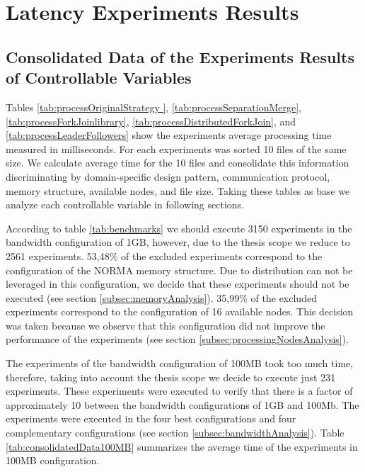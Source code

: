 \section{Latency Experiments Results}

\subsection{Consolidated Data of the Experiments Results of Controllable Variables}
\label{sebsec:consolidatedData}

Tables \ref{tab:processOriginalStrategy }, \ref{tab:processSeparationMerge}, \ref{tab:processForkJoinlibrary}, \ref{tab:processDistributedForkJoin}, and \ref{tab:processLeaderFollowers} show the experiments average processing time measured in milliseconds. For each experiments was sorted 10 files of the same size. We calculate average time for the 10 files and consolidate this information discriminating by domain-specific design pattern, communication protocol, memory structure, available nodes, and file size. Taking these tables as base we analyze each controllable variable in following sections.

According to table \ref{tab:benchmarks} we should execute 3150 experiments in the bandwidth configuration of 1GB, however, due to the thesis scope we reduce to 2561 experiments. 53,48\% of the excluded experiments correspond to the configuration of the NORMA memory structure. Due to distribution can not be leveraged in this configuration, we decide that these experiments should not be executed (see section \ref{subsec:memoryAnalysis}). 35,99\% of the excluded experiments correspond to the configuration of 16 available nodes. This decision was taken because we observe that this configuration did not improve the performance of the experiments (see section \ref{subsec:processingNodesAnalysis}).

The experiments of the bandwidth configuration of 100MB took too much time, therefore, taking into account the thesis scope we decide to execute just 231 experiments. These experiments were executed to verify that there is a factor of approximately 10 between the bandwidth configurations of 1GB and 100Mb. The experiments were executed in the four best configurations and four complementary configurations (see section \ref{subsec:bandwidthAnalysis}). Table \ref{tab:consolidatedData100MB} summarizes the average time of the experiments in 100MB configuration.

